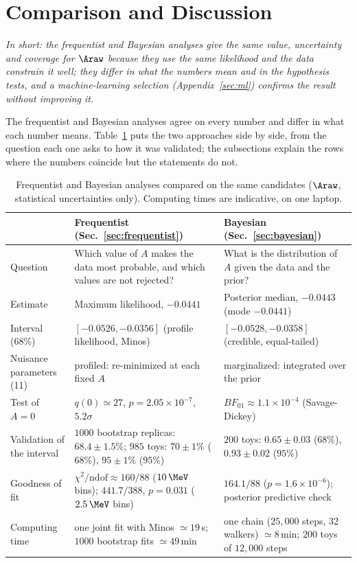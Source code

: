 \section{Comparison and Discussion}
\label{sec:comparison}
\emph{In short: the frequentist and Bayesian analyses give the same value, uncertainty and coverage for $\Araw$ because they use the same likelihood and the data constrain it well; they differ in what the numbers mean and in the hypothesis tests, and a machine-learning selection (Appendix~\ref{sec:ml}) confirms the result without improving it.}

\label{sec:comparison_summary}
The frequentist and Bayesian analyses agree on every number and differ in what each number means. Table~\ref{tab:comparison} puts the two approaches side by side, from the question each one asks to how it was validated; the subsections explain the rows where the numbers coincide but the statements do not.
\begin{table}[t]
\centering
\small
\begin{tabular}{p{2.6cm}p{6.6cm}p{6.6cm}}
\toprule
 & Frequentist (Sec.~\ref{sec:frequentist}) & Bayesian (Sec.~\ref{sec:bayesian}) \\
\midrule
Question & Which value of $A$ makes the data most probable, and which values are not rejected? & What is the distribution of $A$ given the data and the prior? \\
Estimate & Maximum likelihood, $-0.0441$ & Posterior median, $-0.0443$ (mode $-0.0441$) \\
Interval (68\%) & $[-0.0526,-0.0356]$ (profile likelihood, Minos) & $[-0.0528,-0.0358]$ (credible, equal-tailed) \\
Nuisance parameters (11) & profiled: re-minimized at each fixed $A$ & marginalized: integrated over the prior \\
Test of $A=0$ & $q(0)\simeq27$, $p=2.05\times10^{-7}$, $5.2\sigma$ & $BF_{01}\approx1.1\times10^{-4}$ (Savage-Dickey) \\
Validation of the interval & $1000$ bootstrap replicas: $68.4\pm1.5\%$; $985$ toys: $70\pm1\%$ ($68\%$), $95\pm1\%$ ($95\%$) & $200$ toys: $0.65\pm0.03$ ($68\%$), $0.93\pm0.02$ ($95\%$) \\
Goodness of fit & $\chi^2/\mathrm{ndof}\approx160/88$ ($10\,\MeV$ bins); $441.7/388$, $p=0.031$ ($2.5\,\MeV$ bins) & $164.1/88$ ($p=1.6\times10^{-6}$); posterior predictive check \\
Computing time & one joint fit with Minos $\simeq19\,$s; $1000$ bootstrap fits $\simeq49\,$min & one chain ($25{,}000$ steps, 32 walkers) $\simeq8\,$min; $200$ toys of $12{,}000$ steps \\
\bottomrule
\end{tabular}
\caption{Frequentist and Bayesian analyses compared on the same candidates ($\Araw$, statistical uncertainties only). Computing times are indicative, on one laptop.}
\label{tab:comparison}
\end{table}




